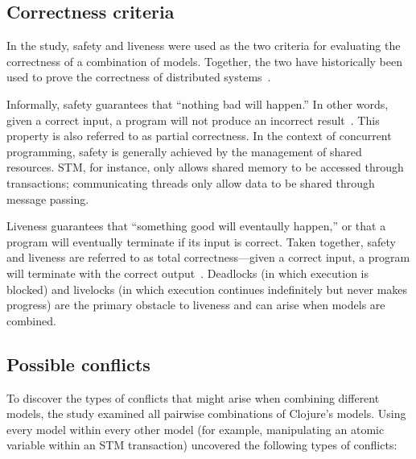 \documentclass{sig-alternate}
\begin{document}
\subsection{Correctness criteria}

In the study, safety and liveness were used as the two criteria for evaluating the correctness of a combination of models. Together, the two have historically been used to prove the correctness of distributed systems~\cite{Lamport1977}.

Informally, safety guarantees that ``nothing bad will happen.'' In other words, given a correct input, a program will not produce an incorrect result~\cite{Swalens2014}. This property is also referred to as partial correctness. In the context of concurrent programming, safety is generally achieved by the management of shared resources. STM, for instance, only allows shared memory to be accessed through transactions; communicating threads only allow data to be shared through message passing.

Liveness guarantees that ``something good will eventaully happen,'' or that a program will eventually terminate if its input is correct. Taken together, safety and liveness are referred to as total correctness---given a correct input, a program will terminate with the correct output~\cite{Swalens2014}. Deadlocks (in which execution is blocked) and livelocks (in which execution continues indefinitely but never makes progress) are the primary obstacle to liveness and can arise when models are combined.

\subsection{Possible conflicts}

To discover the types of conflicts that might arise when combining different models, the study examined all pairwise combinations of Clojure's models. Using every model within every other model (for example, manipulating an atomic variable within an STM transaction) uncovered the following types of conflicts:
\end{document}
